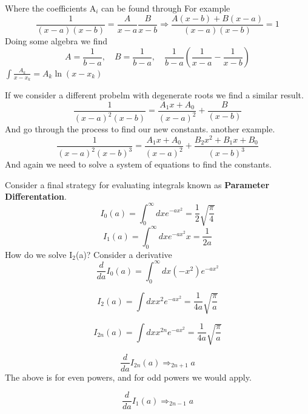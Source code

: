 \documentclass{article}
\newcommand{\be}{\begin{equation}}
\newcommand{\ee}{\end{equation}}
\begin{document}
Where the coefficients A$_i$ can be found through%
For example
\be
\frac{1}{(x-a)(x-b)} = \frac{A}{x-a} \frac{B}{x-b} \Rightarrow \frac{A(x-b) + B(x-a)}{(x-a)(x-b)} = 1
\ee
Doing some algebra we find
\be
A = \frac{1}{b-a}, \quad B = \frac{1}{b-a}, \quad \frac{1}{b-a} \left(\frac{1}{x-a} - \frac{1}{x-b}\right)
\ee
$\int \frac{A_k}{x-x_k} = A_k \ln(x-x_k)$

If we consider a different probelm with degenerate roots we find a similar result.
\be
\frac{1}{(x-a)^2(x-b)} = \frac{A_1x + A_0}{(x-a)^2} + \frac{B}{(x-b)}
\ee
And go through the process to find our new constants. another example.
\be
\frac{1}{(x-a)^2(x-b)^3} = \frac{A_1x + A_0}{(x-a)^2} + \frac{B_2x^2 + B_1x + B_0}{(x-b)^3}
\ee
And again we need to solve a system of equations to find the constants. 

Consider a final strategy for evaluating integrals known as \textbf{Parameter Differentation}.
\be
I_0(a) = \int_0^\infty dx e^{-ax^2} = \frac{1}{2} \sqrt{\frac{\pi}{4}}
\ee
\be
I_1(a) = \int_0^\infty dx e^{-ax^2}x = \frac{1}{2a} 
\ee
How do we solve I$_2$(a)?
Consider a derivative
\be
\frac{d}{da} I_0(a) = \int_0^\infty dx (-x^2) e^{-ax^2}
\ee

\be
I_2(a) = \int dx x^2e^{-ax^2} = \frac{1}{4a} \sqrt{\frac{\pi}{a}}
\ee

\be
I_{2n}(a) = \int dx x^{2n}e^{-ax^2} = \frac{1}{4a} \sqrt{\frac{\pi}{a}}
\ee

\be
\frac{d}{da} I_{2n}(a) \Rightarrow _{2n+1} a
\ee
The above is for even powers, and for odd powers we would apply.

\be
\frac{d}{da} I_1(a) \Rightarrow _{2n-1} a
\ee
\end{document}
